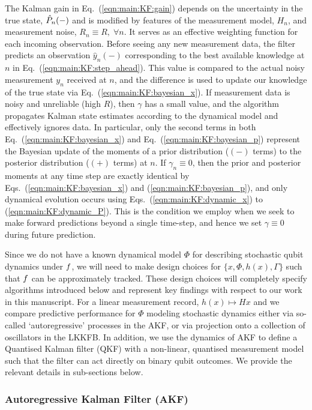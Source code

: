 The Kalman gain in Eq.~(\ref {eqn:main:KF:gain}) depends on the uncertainty in the true state, $\hat{P}_{n}(-)$ and is modified by features of the measurement model, $H_n$, and measurement noise, $R_n \equiv R,\; \forall n$. It serves as an effective weighting function for each incoming observation.  Before seeing any new measurement data, the filter predicts an observation $\hat{y}_n(-)$ corresponding to the best available knowledge at $n$ in Eq.~(\ref {eqn:main:KF:step_ahead}). This value is compared to the actual noisy measurement $y_n$ received at $n$, and the difference is used to update our knowledge of the true state via Eq.~(\ref {eqn:main:KF:bayesian_x}). If measurement data is noisy and unreliable (high $R$), then $\gamma$ has a small value, and the algorithm propagates Kalman state estimates according to the dynamical model and effectively ignores data. In particular, only the second terms in both Eq.~(\ref {eqn:main:KF:bayesian_x}) and Eq.~(\ref {eqn:main:KF:bayesian_p}) represent the Bayesian update of the moments of a prior distribution ($(-)$ terms) to the posterior distribution ($(+)$ terms) at $n$. If $\gamma_n \equiv 0$, then the prior and posterior moments at any time step are exactly identical by Eqs.~(\ref {eqn:main:KF:bayesian_x}) and (\ref {eqn:main:KF:bayesian_p}), and only dynamical evolution occurs using Eqs.~(\ref {eqn:main:KF:dynamic_x}) to (\ref {eqn:main:KF:dynamic_P}).  This is the condition we employ when we seek to make forward predictions beyond a single time-step, and hence we set $\gamma \equiv 0$ during future prediction.

Since we do not have a known dynamical model $\Phi$ for describing stochastic qubit dynamics under $f$, we will need to make design choices for  $\{ x, \Phi, h(x), \Gamma \}$  such that $f$ can be approximately tracked. These design choices will completely specify algorithms introduced below and represent key findings with respect to our work in this manuscript. For a linear measurement record, $h(x) \mapsto Hx$ and we compare predictive performance for $\Phi$ modeling stochastic dynamics either via so-called `autoregressive' processes in the AKF, or via projection onto a collection of oscillators in the LKKFB.  In addition, we use the dynamics of AKF to define a Quantised Kalman filter (QKF) with a non-linear, quantised measurement model such that the filter can act directly on binary qubit outcomes. We provide the relevant details in sub-sections below. 



\subsubsection{Autoregressive Kalman Filter (AKF)}

